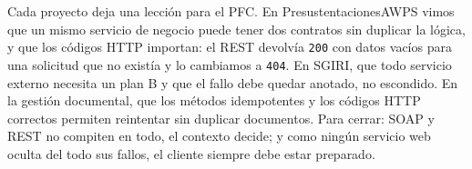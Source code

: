 Cada proyecto deja una lección para el PFC. En PresustentacionesAWPS vimos que un mismo servicio de negocio puede tener dos contratos sin duplicar la lógica, y que los códigos HTTP importan: el REST devolvía \texttt{200} con datos vacíos para una solicitud que no existía y lo cambiamos a \texttt{404}. En SGIRI, que todo servicio externo necesita un plan B y que el fallo debe quedar anotado, no escondido. En la gestión documental, que los métodos idempotentes y los códigos HTTP correctos permiten reintentar sin duplicar documentos. Para cerrar: SOAP y REST no compiten en todo, el contexto decide; y como ningún servicio web oculta del todo sus fallos, el cliente siempre debe estar preparado.

